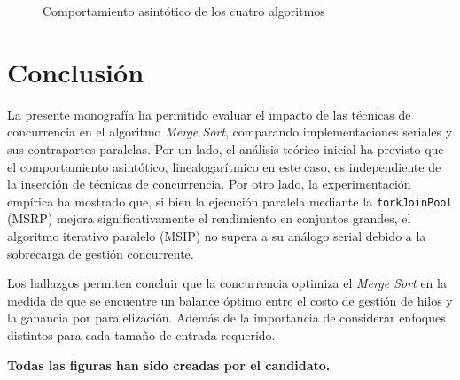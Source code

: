 \documentclass[titlepage]{article}
\begin{document}
\begin{figure}[H]
\begin{minipage}{0.49\textwidth}
	\end{minipage}
	\hfill
	\begin{minipage}{0.49\textwidth}
		\centering
		
	\end{minipage}
	\caption{Comportamiento asintótico de los cuatro algoritmos}
	\label{fig:comparacionCuatro}
\end{figure}

\section{Conclusión}
La presente monografía ha permitido evaluar el impacto de las técnicas de concurrencia en el algoritmo \textit{Merge Sort}, comparando implementaciones seriales y sus contrapartes paralelas. Por un lado, el análisis teórico inicial ha previsto que el comportamiento asintótico, linealogarítmico en este caso, es independiente de la inserción de técnicas de concurrencia. Por otro lado, la experimentación empírica ha mostrado que, si bien la ejecución paralela mediante la \lstinline|forkJoinPool| (MSRP) mejora significativamente el rendimiento en conjuntos grandes, el algoritmo iterativo paralelo (MSIP) no supera a su análogo serial debido a la sobrecarga de gestión concurrente. 

Los hallazgos permiten concluir que la concurrencia optimiza el \textit{Merge Sort} en la medida de que se encuentre un balance óptimo entre el costo de gestión de hilos y la ganancia por paralelización. Además de la importancia de considerar enfoques distintos para cada tamaño de entrada requerido.


\newpage


\textbf{Todas las figuras han sido creadas por el candidato.}
\end{document}
